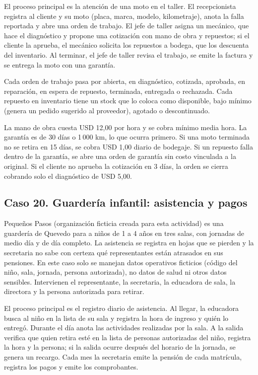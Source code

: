 \documentclass[11pt]{article}
\newcommand{\subseccion}[1]{\subsection{\textcolor{midblue}{#1}}}
\begin{document}
El proceso principal es la atención de una moto en el taller. El recepcionista registra al cliente y su moto (placa, marca, modelo, kilometraje), anota la falla reportada y abre una orden de trabajo. El jefe de taller asigna un mecánico, que hace el diagnóstico y propone una cotización con mano de obra y repuestos; si el cliente la aprueba, el mecánico solicita los repuestos a bodega, que los descuenta del inventario. Al terminar, el jefe de taller revisa el trabajo, se emite la factura y se entrega la moto con una garantía.

Cada orden de trabajo pasa por abierta, en diagnóstico, cotizada, aprobada, en reparación, en espera de repuesto, terminada, entregada o rechazada. Cada repuesto en inventario tiene un stock que lo coloca como disponible, bajo mínimo (genera un pedido sugerido al proveedor), agotado o descontinuado.

La mano de obra cuesta USD 12,00 por hora y se cobra mínimo media hora. La garantía es de 30 días o 1\,000 km, lo que ocurra primero. Si una moto terminada no se retira en 15 días, se cobra USD 1,00 diario de bodegaje. Si un repuesto falla dentro de la garantía, se abre una orden de garantía sin costo vinculada a la original. Si el cliente no aprueba la cotización en 3 días, la orden se cierra cobrando solo el diagnóstico de USD 5,00.

\subseccion{Caso 20. Guardería infantil: asistencia y pagos}
Pequeños Pasos (organización ficticia creada para esta actividad) es una guardería de Quevedo para a niños de 1 a 4 años en tres salas, con jornadas de medio día y de día completo. La asistencia se registra en hojas que se pierden y la secretaria no sabe con certeza qué representantes están atrasados en sus pensiones. En este caso solo se manejan datos operativos ficticios (código del niño, sala, jornada, persona autorizada), no datos de salud ni otros datos sensibles. Intervienen el representante, la secretaria, la educadora de sala, la directora y la persona autorizada para retirar.

El proceso principal es el registro diario de asistencia. Al llegar, la educadora busca al niño en la lista de su sala y registra la hora de ingreso y quién lo entregó. Durante el día anota las actividades realizadas por la sala. A la salida verifica que quien retira esté en la lista de personas autorizadas del niño, registra la hora y la persona; si la salida ocurre después del horario de la jornada, se genera un recargo. Cada mes la secretaria emite la pensión de cada matrícula, registra los pagos y emite los comprobantes.
\end{document}
